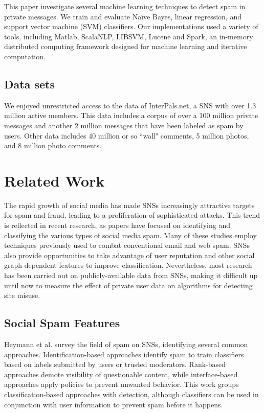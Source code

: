 \documentclass[preprint]{acm_proc_article-sp}
\begin{document}
This paper investigate several machine learning techniques to 
detect spam in private messages. We train and evaluate Na\"ive Bayes, 
linear regression, and support vector machine (SVM) 
classifiers. Our implementations used a variety of tools, 
including Matlab, ScalaNLP, LIBSVM, Lucene and Spark, 
an in-memory distributed computing framework designed for machine 
learning and iterative computation.

\subsection{Data sets}

We enjoyed unrestricted access to the data of InterPals.net, a SNS with 
over 1.3 million active members. This data includes a corpus of over a 
100 million private messages and another 2 million messages that have been 
labeled as spam by users. Other data includes 40 million or so ``wall" 
comments, 5 million photos, and 8 million photo comments. 


\section{Related Work} 

The rapid growth of social media has made SNSs increasingly attractive targets 
for spam and fraud, leading to a proliferation of sophisticated attacks. This 
trend is reflected in recent research, as papers 
have focused on identifying and classifying the various types of social media spam. 
Many of these studies employ techniques previously used to combat conventional 
email and web spam. SNSs also provide opportunities to take advantage of user 
reputation and other social graph-dependent features to improve classification. 
Nevertheless, most research has been carried out on publicly-available data 
from SNSs, making it difficult up until now to measure the effect of private user 
data on algorithms for detecting site misuse.


\subsection{Social Spam Features}

Heymann et al. \cite{heymann} survey the field of spam on SNSs, identifying 
several common approaches. Identification-based approaches identify spam to 
train classifiers based on labels submitted by users or trusted moderators. 
Rank-based approaches demote visibility of questionable content, while interface-based 
approaches apply policies to prevent unwanted behavior. This work groups 
classification-based approaches with detection, although classifiers can be 
used in conjunction with user information to prevent spam before it happens.
\end{document}
